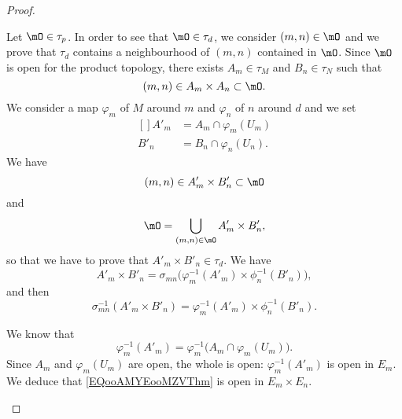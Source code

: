 \begin{proof}
	\begin{subproof}
		Let \( \mO\in\tau_p\). In order to see that \( \mO\in \tau_d\), we consider \( (m,n)\in \mO\) and we prove that \( \tau_d\) contains a neighbourhood of \( (m,n)\) contained in \( \mO\). Since \( \mO\) is open for the product topology, there exists \( A_m\in\tau_M\) and \( B_n\in \tau_N\) such that
		\begin{equation}
			(m,n)\in A_m\times A_n\subset\mO.
		\end{equation}
		We consider a map \( \varphi_m\) of \( M\) around \( m\) and \( \varphi_n\) of \( n\) around \( d\) and we set
		\begin{equation}
			\begin{aligned}[]
				A'_m & =A_m\cap \varphi_m(U_m)  \\
				B'_n & =B_n\cap \varphi_n(U_n).
			\end{aligned}
		\end{equation}
		We have
		\begin{equation}
			(m,n)\in A'_m\times B'_n\subset \mO
		\end{equation}
		and
		\begin{equation}
			\mO=\bigcup_{(m,n)\in \mO}A'_m\times B'_n,
		\end{equation}
		so that we have to prove that \( A'_m\times B'_n\in\tau_d\). We have
		\begin{equation}
			A'_m\times B'_n=\sigma_{mn}\big( \varphi_m^{-1}(A'_m)\times \phi_n^{-1}(B'_n) \big),
		\end{equation}
		and then
		\begin{equation}		\label{EQooAMYEooMZVThm}
			\sigma_{mn}^{-1}(A'_m\times B'_n)=\varphi_m^{-1}(A'_m)\times \phi_n^{-1}(B'_n).
		\end{equation}

		We know that
		\begin{equation}
			\varphi_m^{-1}(A'_m)=\varphi_m^{-1}\big(A_m\cap\varphi_m(U_m)\big).
		\end{equation}
		Since \( A_m\) and \( \varphi_m(U_m)\) are open, the whole is open: \( \varphi_m^{-1}(A'_m)\) is open in \( E_m\). We deduce that \eqref{EQooAMYEooMZVThm} is open in \( E_m\times E_n\).


\end{subproof}
\end{proof}
